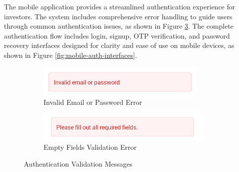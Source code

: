 The mobile application provides a streamlined authentication experience for investors. The system includes comprehensive error handling to guide users through common authentication issues, as shown in Figure \ref{fig:mobile-auth-errors}. The complete authentication flow includes login, signup, OTP verification, and password recovery interfaces designed for clarity and ease of use on mobile devices, as shown in Figure \ref{fig:mobile-auth-interfaces}.
\begin{figure}[htbp]
    \centering
    \begin{subfigure}[b]{0.45\textwidth}
        \centering
        \includegraphics[width=\textwidth]{images/mobile-auth-screen_invalidemailorpass.png}
        \caption{Invalid Email or Password Error}
        \label{fig:mobile-invalid-credentials}
    \end{subfigure}
    \hfill
    \begin{subfigure}[b]{0.45\textwidth}
        \centering
        \includegraphics[width=\textwidth]{images/mobile-auth-screen_emptyfieldsmessage.png}
        \caption{Empty Fields Validation Error}
        \label{fig:mobile-empty-fields}
    \end{subfigure}
    \caption{Authentication Validation Messages}
    \label{fig:mobile-auth-errors}
\end{figure}
\newpage 

